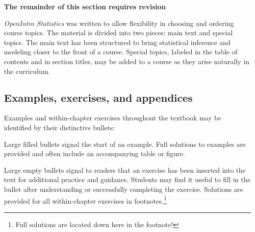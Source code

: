 \textbf{The remainder of this section requires revision}


\emph{OpenIntro Statistics} was written to allow flexibility in choosing and ordering course topics. The material is divided into two pieces: main text and special topics. The main text has been structured to bring statistical inference and modeling closer to the front of a course. Special topics, labeled in the table of contents and in section titles, may be added to a course as they arise naturally in the curriculum.


\subsection*{Examples, exercises, and appendices}

Examples and within-chapter exercises throughout the textbook may be identified by their distinctive bullets:

\begin{example}{Large filled bullets signal the start of an example.}
Full solutions to examples are provided and often include an accompanying table or figure.
 \end{example}

\begin{exercise}
Large empty bullets signal to readers that an exercise has been inserted into the text for additional practice and guidance. Students may find it useful to fill in the bullet after understanding or successfully completing the exercise. Solutions are provided for all within-chapter exercises in footnotes.\footnote{Full solutions are located down here in the footnote!}
\end{exercise}

